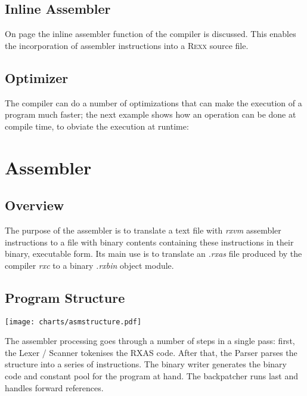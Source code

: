  \section{Inline Assembler}
 On page \pageref{inlineAssembly} the inline assembler function of
 the \crexx{} compiler is discussed. This enables the incorporation
 of  assembler instructions into a \textsc{Rexx} source
 file.

\section{Optimizer}\label{fpowexample}
 The compiler can do a number of optimizations that can make the
 execution of a program much faster; the next example shows how an
 operation can be done at compile time, to obviate the execution at
 runtime:

\begin{shaded}
  \small
\obeylines {}
\end{shaded}

 
\chapter{\crexx{} Assembler}
\section{Overview}
The purpose of the \crexx{} assembler  is to translate a text file with
\emph{rxvm} assembler instructions to a file with binary contents containing these
instructions in their binary, executable form. Its main use is to
translate an \emph{.rxas} file produced by the \crexx{} compiler
\emph{rxc} to a binary \emph{.rxbin} object module.

\section{Program Structure}
\texttt{[image: charts/asmstructure.pdf]}

The assembler processing goes through a number of steps in a single
pass: first, the Lexer / Scanner tokenises the RXAS code. After that,
the Parser parses the structure into a series of instructions. The
binary writer generates the binary code and constant pool for the
program at hand. The backpatcher runs last and handles forward references.

